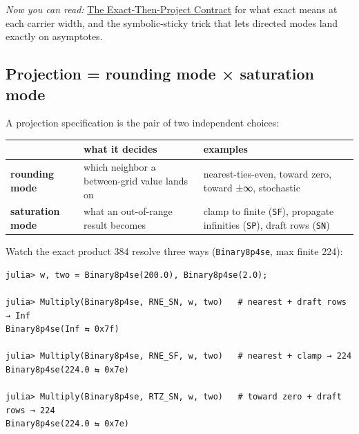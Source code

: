 \emph{Now you can read:} \href{concept\_\allowbreak{}exact\_\allowbreak{}then\_\allowbreak{}project.md}{The Exact-Then-Project Contract} for what {\textquotedbl}exact{\textquotedbl} means at each carrier width, and the symbolic-sticky trick that lets directed modes land exactly on asymptotes.



\subsection{Projection = rounding mode × saturation mode}



\label{17571958099282935615}{}


A projection specification is the pair of two independent choices:




\begin{table}[h]
\centering
\begin{tabulary}{\linewidth}{L L L}
\toprule
 & what it decides & examples \\
\toprule
\textbf{rounding mode} & which neighbor a between-grid value lands on & nearest-ties-even, toward zero, toward ±∞, stochastic \\
\textbf{saturation mode} & what an out-of-range result becomes & clamp to finite (\texttt{SF}), propagate infinities (\texttt{SP}), draft rows (\texttt{SN}) \\
\bottomrule
\end{tabulary}

\end{table}



Watch the exact product 384 resolve three ways (\texttt{Binary8p4se}, max finite 224):




\nopagebreak[4]
\begin{verbatim}
julia> w, two = Binary8p4se(200.0), Binary8p4se(2.0);

julia> Multiply(Binary8p4se, RNE_SN, w, two)   # nearest + draft rows → Inf
Binary8p4se(Inf ⇆ 0x7f)

julia> Multiply(Binary8p4se, RNE_SF, w, two)   # nearest + clamp → 224
Binary8p4se(224.0 ⇆ 0x7e)

julia> Multiply(Binary8p4se, RTZ_SN, w, two)   # toward zero + draft rows → 224
Binary8p4se(224.0 ⇆ 0x7e)
\end{verbatim}



